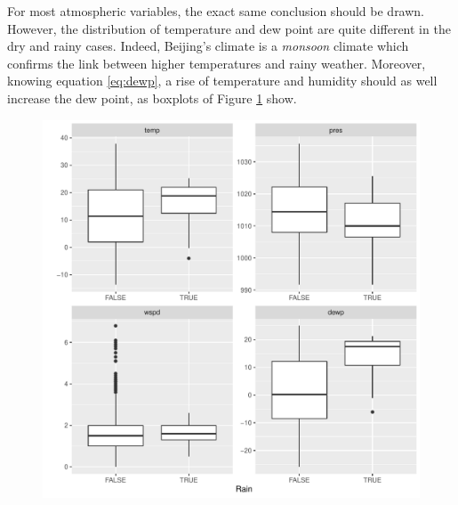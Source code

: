 \documentclass[a4paper, 12pt]{article}
\begin{document}

    For most atmospheric variables, the exact same conclusion should be drawn. However, the distribution of temperature and dew point are quite different in the dry and rainy cases. Indeed, Beijing's climate is a \emph{monsoon} climate which confirms the link between higher temperatures and rainy weather. Moreover, knowing equation \eqref{eq:dewp}, a rise of temperature and humidity should as well increase the dew point, as boxplots of Figure \ref{fig:atmospheric_rain} show.
	\begin{figure}[H]
	    \centering
	    \includegraphics[height=0.55\textwidth]{resources/pdf/atmospherical_rain.pdf}
	    \label{fig:atmospheric_rain}
	\end{figure}
	
\end{document}
